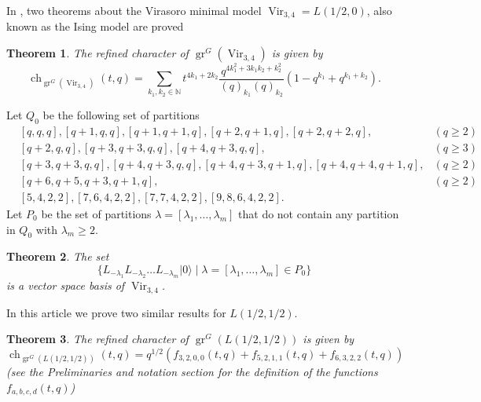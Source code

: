 \documentclass[12pt,a4paper]{article}
\newtheorem{theorem}{Theorem}
\DeclareMathOperator{\Vir}{Vir}
\DeclareMathOperator{\gr}{gr}
\DeclareMathOperator{\ch}{ch}
\newcommand{\vac}{|0\rangle}
\begin{document}
In \cite{andrews_singular_2022}, two theorems about the Virasoro minimal model $\Vir_{3,4}=L(1/2,0)$, also known as the Ising model are proved
\begin{theorem}
  \label{thr:1}
  The refined character of $\gr^G(\Vir_{3,4})$ is given by
  \begin{equation*}
    \ch_{\gr^G(\Vir_{3,4})}(t,q)=\sum_{k_1,k_2\in \mathbb{N}}t^{4k_1+2k_2}\frac{q^{4k_1^2+3k_1k_2+k_2^2}}{(q)_{k_1}(q)_{k_2}}(1-q^{k_1}+q^{k_1+k_2}).
  \end{equation*}
\end{theorem}
Let $Q_0$ be the following set of partitions
\begin{align*}
  &[q,q,q],[q+1,q,q],[q+1,q+1,q],[q+2,q+1,q],[q+2,q+2,q], &(q\ge 2) \\
  &[q+2,q,q], [q+3,q+3,q,q], [q+4,q+3,q,q], &(q\ge 3) \\
  &[q+3,q+3,q,q], [q+4,q+3,q,q], [q+4,q+3,q+1,q], [q+4,q+4,q+1,q], &(q\ge 2) \\
  &[q+6,q+5,q+3,q+1,q], &(q\ge 2) \\
  &[5,4,2,2],[7,6,4,2,2],[7,7,4,2,2],[9,8,6,4,2,2].
\end{align*}
Let $P_0$ be the set of partitions $\lambda=[\lambda_1,\dots, \lambda_m]$ that do not contain any partition in $Q_0$ with $\lambda_m\ge 2$.
\begin{theorem}
  \label{thr:2}
  The set
  \begin{equation*}
    \{L_{-\lambda_1}L_{-\lambda_2}\dots L_{-\lambda_m}\vac\mid \lambda=[\lambda_1,\dots, \lambda_m]\in P_0\}
  \end{equation*}
  is a vector space basis of $\Vir_{3,4}$.
\end{theorem}

In this article we prove two similar results for $L(1/2,1/2)$.
\begin{theorem}
  \label{thr:3}
  The refined character of $\gr^G(L(1/2,1/2))$ is given by
  \begin{equation*}
    \ch_{\gr^G(L(1/2,1/2))}(t,q)=q^{1/2}(f_{3,2,0,0}(t,q)+f_{5,2,1,1}(t,q)+f_{6,3,2,2}(t,q))
  \end{equation*}
  (see the Preliminaries and notation section for the definition of the functions $f_{a,b,c,d}(t,q)$)
\end{theorem}
\end{document}
